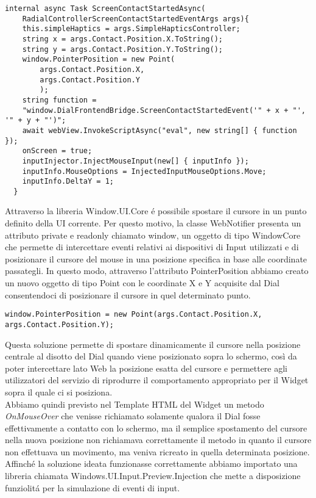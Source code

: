 \vspace{1.0cm}
\begin{lstlisting}[caption={Metodo ScreenContactStartedAsync},style=javaScriptCode]
 internal async Task ScreenContactStartedAsync(
 	RadialControllerScreenContactStartedEventArgs args){
    this.simpleHaptics = args.SimpleHapticsController;
    string x = args.Contact.Position.X.ToString();
    string y = args.Contact.Position.Y.ToString();
    window.PointerPosition = new Point(
    	args.Contact.Position.X, 
    	args.Contact.Position.Y
    	);
    string function = 
    "window.DialFrontendBridge.ScreenContactStartedEvent('" + x + "', '" + y + "')";
    await webView.InvokeScriptAsync("eval", new string[] { function });
    onScreen = true;
    inputInjector.InjectMouseInput(new[] { inputInfo });
    inputInfo.MouseOptions = InjectedInputMouseOptions.Move;
    inputInfo.DeltaY = 1;
  }
\end{lstlisting} 
\vspace{1.0cm}

Attraverso la libreria Window.UI.Core é possibile spostare il cursore in un punto definito della UI corrente. Per questo motivo, la classe WebNotifier presenta un attributo private e readonly chiamato window, un oggetto di tipo WindowCore che permette di intercettare eventi relativi ai dispositivi di Input utilizzati e di posizionare il cursore del mouse in una posizione specifica in base alle coordinate passategli. In questo modo, attraverso l’attributo PointerPosition abbiamo creato un nuovo oggetto di tipo Point con le coordinate X e Y acquisite dal Dial consentendoci di posizionare il cursore in quel determinato punto.
\vspace{1.0cm}
\begin{lstlisting}[caption={Spostamento cursore},style=javaScriptCode]
  window.PointerPosition = new Point(args.Contact.Position.X, args.Contact.Position.Y);
\end{lstlisting} 
\vspace{1.0cm}
Questa soluzione permette di spostare dinamicamente il cursore nella posizione centrale al disotto del Dial quando viene posizionato sopra lo schermo, così da poter intercettare lato Web la posizione esatta del cursore e permettere agli utilizzatori del servizio di riprodurre il comportamento appropriato per il Widget sopra il quale ci si posiziona.\\

Abbiamo quindi previsto nel Template HTML del Widget un metodo \emph{OnMouseOver} che venisse richiamato solamente qualora il Dial fosse effettivamente a contatto con lo schermo, ma il semplice spostamento del cursore nella nuova posizione non richiamava correttamente il metodo in quanto il cursore non effettuava un movimento, ma veniva ricreato in quella determinata posizione.
Affinché la soluzione ideata funzionasse correttamente abbiamo importato una libreria chiamata Windows.UI.Input.Preview.Injection che mette a disposizione funziolitá per la simulazione di eventi di input.\\

